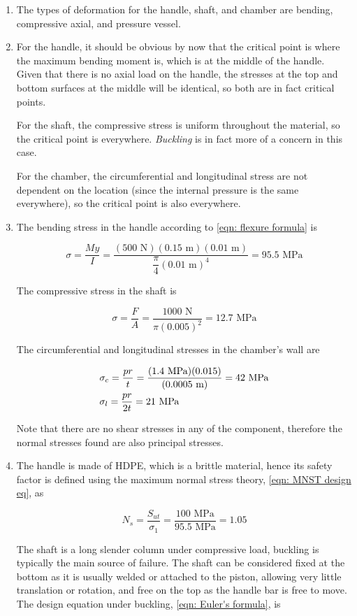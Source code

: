\documentclass[
10pt,
a4paper,
openany,
svgnames,
]{book}
\begin{document}
\begin{enumerate}
\item The types of deformation for the handle, shaft, and chamber are bending, compressive axial, and pressure vessel.
\item For the handle, it should be obvious by now that the critical point is where the maximum bending moment is, which is at the middle of the handle. Given that there is no axial load on the handle, the stresses at the top and bottom surfaces at the middle will be identical, so both are in fact critical points.
  
  For the shaft, the compressive stress is uniform throughout the material, so the critical point is everywhere. \emph{Buckling} is in fact more of a concern in this case.
  
  For the chamber, the circumferential and longitudinal stress are not dependent on the location (since the internal pressure is the same everywhere), so the critical point is also everywhere.
  
\item The bending stress in the handle according to \cref{eqn: flexure formula} is

  \[\sigma = \frac{My}{I} = \frac{(500 \text{ N})(0.15 \text{ m})(0.01 \text{ m})}{\dfrac{\pi }{4}{(0.01 \text{ m})^4}} = 95.5 \text{ MPa}\]

The compressive stress in the shaft is

\[\sigma = \frac{F}{A} = \frac{1000 \text{ N}}{\pi (0.005)^2} = 12.7 \text{ MPa}\]

The circumferential and longitudinal stresses in the chamber’s wall are

\[\begin{gathered}
  \sigma_c = \frac{pr}{t} = \frac{(1.4 \text{ MPa})(0.015)}{(0.0005 \text{ m})} = 42 \text{ MPa} \hfill \\
  \sigma_l = \frac{pr}{2t} = 21 \text{ MPa} \hfill \\ 
\end{gathered} \]

Note that there are no shear stresses in any of the component, therefore the normal stresses found are also principal stresses.
\item The handle is made of HDPE, which is a brittle material, hence its safety factor is defined using the maximum normal stress theory, \cref{eqn: MNST design eq}, as

  \[N_s = \frac{S_{ut}}{\sigma_1} = \frac{100\text{ MPa}}{95.5\text{ MPa}} = 1.05\]

The shaft is a long slender column under compressive load, buckling is typically the main source of failure. The shaft can be considered fixed at the bottom as it is usually welded or attached to the piston, allowing very little translation or rotation, and free on the top as the handle bar is free to move. The design equation under buckling, \cref{eqn: Euler's formula}, is 


\end{enumerate}
\end{document}
